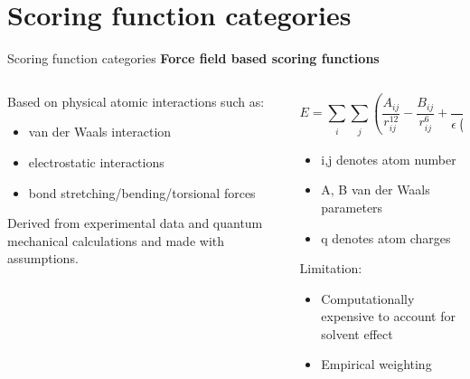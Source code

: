 \section{Scoring function categories}
\begin{appendixframe}{Scoring function categories}
\centering
\textbf{Force field based scoring functions}
\begin{columns}[T]
\begin{column}{0.4\textwidth}
Based on physical atomic interactions such as:
\begin{itemize}
    \item van der Waals interaction
    \item electrostatic interactions
    \item bond stretching/bending/torsional forces
\end{itemize}
Derived from experimental data and quantum mechanical calculations and made with assumptions.
\end{column}

\begin{column}{0.4\textwidth}
\begin{equation*}
E = \sum_{\substack{i}}\sum_{\substack{j}} (\frac{A_{ij}}{r^{12}_{ij}} - \frac{B_{ij}}{r^{6}_{ij}} + \frac{q_i q_j}{\epsilon (r_{ij})r_{ij}}) 
\end{equation*}
\begin{itemize}
    \item i,j denotes atom number
    \item A, B van der Waals parameters
    \item q denotes atom charges
\end{itemize}
Limitation:
\begin{itemize}
    \item Computationally expensive to account for solvent effect 
    \item Empirical weighting 
\end{itemize}
\end{column}
\end{columns}
\end{appendixframe}










